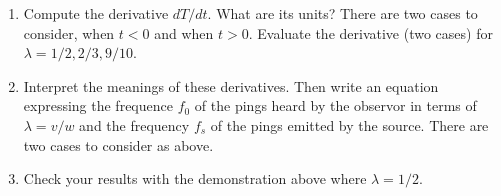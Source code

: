 \documentclass{ximera}
\begin{document}
\begin{example}
\begin{enumerate}
\item Compute the derivative $dT/dt$. What are its units? There are two cases to consider, when $t<0$ and when $t>0$. Evaluate the derivative (two cases) for $\lambda = 1/2, 2/3, 9/10$.

\item Interpret the meanings of these derivatives. Then write an equation expressing the frequence $f_0$ of the pings heard by the observor in terms of $\lambda = v/w$ and the frequency $f_s$ of the pings emitted by the source. There are two cases to consider as above. 

\item Check your results with the demonstration above where $\lambda = 1/2$.

\end{enumerate}

\end{example}
\end{document}
